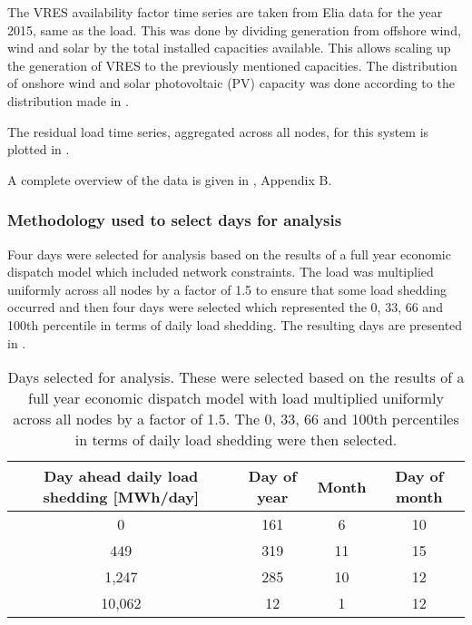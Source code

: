 \documentclass[number,times]{elsarticle}
\begin{document}
The \ac{VRES} availability factor time series are taken from Elia data for the year 2015, same as the load. This was done by dividing generation from offshore wind, wind and solar by the total installed capacities available. This allows scaling up the generation of \ac{VRES} to the previously mentioned capacities. The distribution of onshore wind and solar photovoltaic (PV) capacity was done according to the distribution made in \cite{DelarueErik2016Dtio}.

The residual load time series, aggregated across all nodes, for this system is plotted in .

A complete overview of the data is given in \cite{Belderbos2020}, Appendix B.

\subsubsection{Methodology used to select days for analysis}

Four days were selected for analysis based on the results of a full year economic dispatch model which included network constraints. The load was multiplied uniformly across all nodes by a factor of 1.5 to ensure that some load shedding occurred and then four days were selected which represented the 0, 33, 66 and 100th percentile in terms of daily load shedding. The resulting days are presented in .

\begin{table}[H]
    \centering
    \begin{tabular}{cccc}
        \toprule
        Day ahead daily load shedding [MWh/day] & Day of year & Month & Day of month \\
        \midrule
        0                                       & 161         & 6     & 10           \\
        449                                     & 319         & 11    & 15           \\
        1,247                                   & 285         & 10    & 12           \\
        10,062                                  & 12          & 1     & 12           \\
        \bottomrule
    \end{tabular}
    \caption{Days selected for analysis. These were selected based on the results of a full year economic dispatch model with load multiplied uniformly across all nodes by a factor of 1.5. The 0, 33, 66 and 100th percentiles in terms of daily load shedding were then selected.}\label{tab:day_selection}
\end{table}
\end{document}
